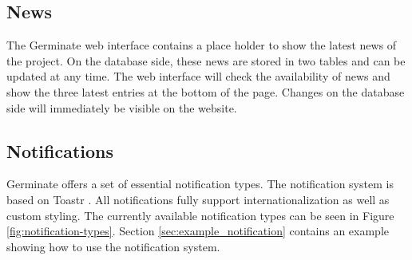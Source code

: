 \subsection{News}
The Germinate web interface contains a place holder to show the latest news of the project. On the database side, these news are stored in two tables and can be updated at any time. The web interface will check the availability of news and show the three latest entries at the bottom of the page. Changes on the database side will immediately be visible on the website.

\subsection{Notifications}
Germinate offers a set of essential notification types. The notification system is based on Toastr \cite{Toastr}. All notifications fully support internationalization as well as custom styling. The currently available notification types can be seen in Figure \ref{fig:notification-types}. Section \ref{sec:example_notification} contains an example showing how to use the notification system.

